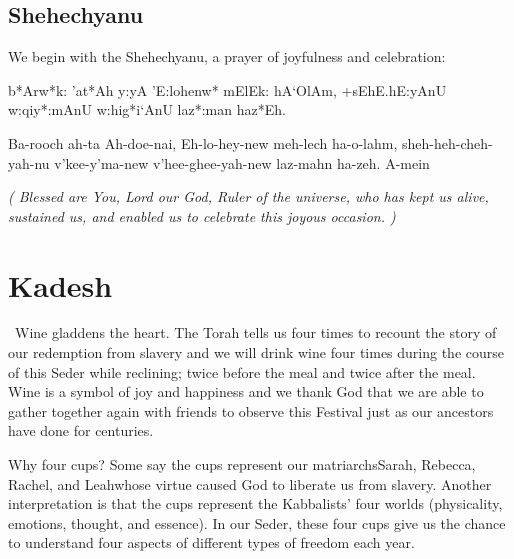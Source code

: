 \documentclass[12pt]{article}
\newenvironment{hebrewPrayer}
    {\begin{cjhebrew}
     \Large
    }
    { 
    \end{cjhebrew}
    }
\newenvironment{hebrewTransliteration}{}{\par}
\newenvironment{unreadHebrewTranslation}{\itshape(\hspace{-0.2em}}{\hspace{-0.2em})\par}
\newcommand{\god}{God}
\newcommand{\hebrewVowelDotDotL}{e} %
\newcommand{\transliterateAdonai}{Ah-doe-nai}
\newcommand{\transliterateEloheinu}{Eh-lo-hey-new}
\newcommand{\baruchAdonai}{b*Arw*k: 'at*Ah y:yA}
\newcommand{\transliterateBaruchAdonai}{Ba-rooch ah-ta {\transliterateAdonai}}
\newcommand{\translateBaruchAdonai}{Blessed are You, Lord our \god}
\newcommand{\baruchHaolam}{{\baruchAdonai} 'E:loh{\hebrewVowelDotDotL}nw* mElEk: hA`OlAm}
\newcommand{\transliterateBaruchHaolam}{{\transliterateBaruchAdonai}, {\transliterateEloheinu} meh-lech ha-o-lahm}
\newcommand{\translateBaruchHaolam}{{\translateBaruchAdonai}, Ruler of the universe}
\newcommand{\inlineSederAction}[1]{\faHandORight{}~\underline{#1}}
\newcommand{\sederAction}[1]{\inlineSederAction{#1}\par}
\newcommand{\sederSection}[2]{
    \section*{#1 \Huge\cjRL{#2}}
}
\newcommand{\newReading}{\faBook{}\ }
\begin{document}
\begin{minipage}[t]{\textwidth}
    \subsection*{Shehechyanu}
    We begin with the Shehechyanu, a prayer of joyfulness and celebration:
    
    \begin{hebrewPrayer}
        \baruchHaolam\textrm{,} +sEhE.hE:yAnU w:qiy*:mAnU w:hig*i`AnU laz*:man haz*Eh\textrm{.}
    \end{hebrewPrayer}
    
    \begin{hebrewTransliteration}
        {\transliterateBaruchHaolam}, sheh-heh-cheh-yah-nu v'kee-y'ma-new v'hee-ghee-yah-new laz-mahn ha-zeh. A-mein
    \end{hebrewTransliteration}
    \begin{unreadHebrewTranslation}
        {\translateBaruchHaolam}, who has kept us alive, sustained us, and enabled us to celebrate this joyous occasion.
    \end{unreadHebrewTranslation}
\end{minipage}
\sederSection{Kadesh}{qade+s}
\newReading Wine gladdens the heart. The Torah tells us four times to recount the story of our redemption from slavery and we will drink wine four times during the course of this Seder while reclining; twice before the meal and twice after the meal. Wine is a symbol of joy and happiness and we thank \god{} that we are able to gather together again with friends to observe this Festival just as our ancestors have done for centuries.

Why four cups? Some say the cups represent our matriarchs\textemdash{}Sarah, Rebecca, Rachel, and Leah\textemdash{}whose virtue caused \god{} to liberate us from slavery. Another interpretation is that the cups represent the Kabbalists' four worlds (physicality, emotions, thought, and essence). In our Seder, these four cups give us the chance to understand four aspects of different types of freedom each year. %
{\wineSummaryThisYear}

{\wineFirstCup}

\end{document}
